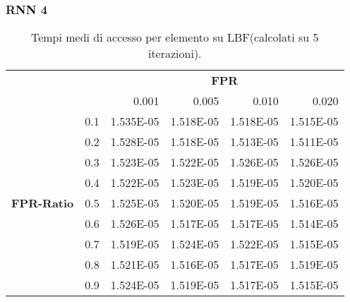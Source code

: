\documentclass[4apaper,11pt]{report}
\begin{document}
    \subsubsection{RNN 4}

    \begin{table}[H]
        \centering
        \begin{tabular}{llrrrr}
        \toprule
        {} & & \multicolumn{4}{c}{\textbf{FPR}}\\
        {} & &    0.001 &     0.005 &     0.010 &     0.020 \\
        \midrule
        \multirow{9}{*}{\textbf{FPR-Ratio}} & 0.1& 1.535E-05 & 1.518E-05 & 1.518E-05 & 1.515E-05 \\
        &0.2& 1.528E-05 & 1.518E-05 & 1.513E-05 & 1.511E-05 \\
        &0.3& 1.523E-05 & 1.522E-05 & 1.526E-05 & 1.526E-05 \\
        &0.4& 1.522E-05 & 1.523E-05 & 1.519E-05 & 1.520E-05 \\
        &0.5& 1.525E-05 & 1.520E-05 & 1.519E-05 & 1.516E-05 \\
        &0.6& 1.526E-05 & 1.517E-05 & 1.517E-05 & 1.514E-05 \\
        &0.7& 1.519E-05 & 1.524E-05 & 1.522E-05 & 1.515E-05 \\
        &0.8& 1.521E-05 & 1.516E-05 & 1.517E-05 & 1.519E-05 \\
        &0.9& 1.524E-05 & 1.519E-05 & 1.517E-05 & 1.515E-05 \\
        \bottomrule
        \end{tabular}
        \caption{Tempi medi di accesso per elemento su LBF(calcolati su 5 iterazioni).}
    \end{table}
\end{document}
